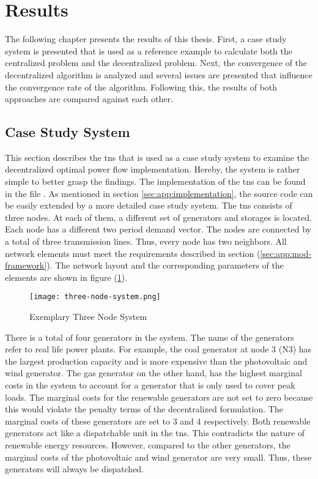 \section{Results}
\label{sec:res}

The following chapter presents the results of this thesis. First, a case study system is presented that is used as a reference example to calculate both the centralized problem and the decentralized problem. Next, the convergence of the decentralized algorithm is analyzed and several issues are presented that influence the convergence rate of the algorithm. Following this, the results of both approaches are compared against each other.

\subsection{Case Study System}
\label{sec:res:tns}

This section describes the \gls{tns} that is used as a case study system to examine the decentralized optimal power flow implementation. Hereby, the system is rather simple to better grasp the findings. The implementation of the \gls{tns} can be found in the file . As mentioned in section \ref{sec:app:implementation}, the source code can be easily extended by a more detailed case study system. The \gls{tns} consists of three nodes. At each of them, a different set of generators and storages is located. Each node has a different two period demand vector. The nodes are connected by a total of three transmission lines. Thus, every node has two neighbors. All network elements must meet the requirements described in section (\ref{sec:app:mod-framework}). The network layout and the corresponding parameters of the elements are shown in figure (\ref{fig:tns}).

\begin{figure}[h]
	\centering
	\texttt{[image: three-node-system.png]}
	\caption{Exemplary Three Node System}
	\label{fig:tns}
\end{figure}

There is a total of four generators in the system. The name of the generators refer to real life power plants. For example, the coal generator at node 3 (N3) has the largest production capacity and is more expensive than the photovoltaic and wind generator. The gas generator on the other hand, has the highest marginal costs in the system to account for a generator that is only used to cover peak loads. The marginal costs for the renewable generators are not set to zero because this would violate the penalty terms of the decentralized formulation. The marginal costs of these generators are set to 3 and 4 respectively. Both renewable generators act like a dispatchable unit in the \gls{tns}. This contradicts the nature of renewable energy resources. However, compared to the other generators, the marginal costs of the photovoltaic and wind generator are very small. Thus, these generators will always be dispatched.

